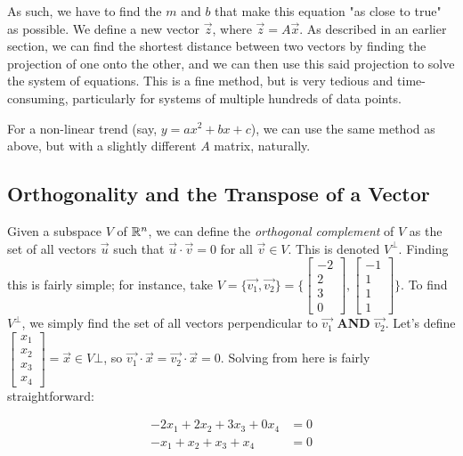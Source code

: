 \documentclass[12pt]{article}
\begin{document}
{As such, we have to find the $m$ and $b$ that make this equation "as close to true" as possible. We define a new vector $\vec{z}$, where $\vec{z} = A\vec
x$. As described in an earlier section, we can find the shortest distance between two vectors by finding the projection of one onto the other, and we can then use this said projection to solve the system of equations. This is a fine method, but is very tedious and time-consuming, particularly for systems of multiple hundreds of data points.

For a non-linear trend (say, $y=ax^2+bx+c$), we can use the same method as above, but with a slightly different $A$ matrix, naturally.


\subsection{Orthogonality and the Transpose of a Vector}

Given a subspace $V$ of $\mathbb{R}^n$, we can define the \textit{orthogonal complement} of $V$ as the set of all vectors $\vec{u}$ such that $\vec{u}\cdot\vec{v} = 0$ for all $\vec{v}\in V$. This is denoted $V^\bot$. Finding this is fairly simple; for instance, take $V = \{\vec{v_1}, \vec{v_2}\}= \{\begin{bmatrix}-2\\
    2\\
    3\\
    0
\end{bmatrix}, \begin{bmatrix}-1\\
    1\\
    1\\
    1
\end{bmatrix}
\}$. To find $V^\bot$, we simply find the set of all vectors perpendicular to $\vec{v_1}$ \textbf{AND} $\vec{v_2}$. Let's define $\begin{bmatrix}
    x_1\\
    x_2\\
    x_3\\
    x_4\end{bmatrix} = \vec{x} \in V\bot$, so $\vec{v_1}\cdot\vec{x} = \vec{v_2}\cdot\vec{x} = 0$. Solving from here is fairly straightforward:

\begin{equation}
    \begin{split}
        -2x_1 + 2x_2 + 3x_3 +0x_4&= 0\\
        -x_1 + x_2 + x_3 +x_4 &= 0\\
    \end{split}
\end{equation}

}
\end{document}
